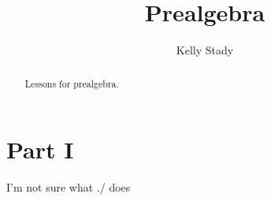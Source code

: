 \documentclass{xourse}
\title{Prealgebra}
\author{Kelly Stady}
\begin{document}
\begin{abstract}
    Lessons for prealgebra.
\end{abstract}
\maketitle

\part{Part I}  %

   I'm not sure what ./ does
\end{document}
